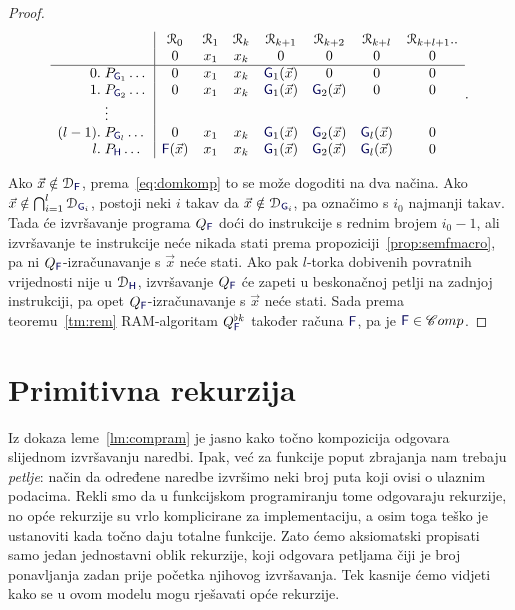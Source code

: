 \begin{proof}
\begin{equation}
\begin{array}{r@{\;}l|ccccccc}
      &               &\reg0       &\reg1&\reg{k}&\reg{k+1}     &\reg{k+2}     &\reg{k+l}     &\reg{k+l+1}..\\
      &               & 0          &x_1  &x_k    &0             &0             &0             &0            \\\hline
0.    &P_{\f G_1}\dots& 0          &x_1  &x_k    &\f G_1(\vec x)&0             &0             &0            \\
1.    &P_{\f G_2}\dots& 0          &x_1  &x_k    &\f G_1(\vec x)&\f G_2(\vec x)&0             &0            \\
      &\vdots                                                                                               \\
(l-1).&P_{\f G_l}\dots& 0          &x_1  &x_k    &\f G_1(\vec x)&\f G_2(\vec x)&\f G_l(\vec x)&0            \\
l.    &P_{\f H}\dots  &\f F(\vec x)&x_1  &x_k    &\f G_1(\vec x)&\f G_2(\vec x)&\f G_l(\vec x)&0
    \end{array}\text.
\end{equation}
\smallskip

Ako $\vec x\notin\dom{\f F}$, prema~\eqref{eq:domkomp} to se može dogoditi na dva načina. Ako $\vec x\notin\bigcap_{i=1}^l\dom{\f G_i}$, postoji neki $i$ takav da $\vec x\notin\dom{\f G_i}$, pa označimo s $i_0$ najmanji takav. Tada će izvršavanje programa $Q_{\f F}$ doći do instrukcije s rednim brojem $i_0-1$, ali izvršavanje te instrukcije neće nikada stati prema propoziciji~\ref{prop:semfmacro}, pa ni $Q_{\f F}$-izračunavanje s $\vec x$ neće stati. Ako pak $l$-torka dobivenih povratnih vrijednosti nije u $\dom{\f H}$, izvršavanje $Q_{\f F}$ će zapeti u beskonačnoj petlji na zadnjoj instrukciji, pa opet $Q_{\f F}$-izračunavanje s $\vec x$ neće stati.
Sada prema teoremu~\ref{tm:rem} RAM-algoritam $Q_{\f F}^{\flat k}$ također računa $\f F$, pa je $\f F\in\mathscr Comp$.
\end{proof}

\section{Primitivna rekurzija}

Iz dokaza leme~\ref{lm:compram} je jasno kako točno kompozicija odgovara slijednom iz\-vrša\-va\-nju naredbi. Ipak, već za funkcije poput zbrajanja nam trebaju \emph{petlje}: način da određene naredbe izvršimo neki broj puta koji ovisi o ulaznim podacima. Rekli smo da u funkcijskom programiranju tome odgovaraju rekurzije, no opće rekurzije su vrlo komplicirane za implementaciju, a osim toga teško je ustanoviti kada točno daju totalne funkcije. Zato ćemo aksiomatski propisati samo jedan jednostavni oblik rekurzije, koji odgovara petljama čiji je broj ponavljanja zadan prije početka njihovog izvršavanja. Tek kasnije ćemo vidjeti kako se u ovom modelu mogu rješavati opće rekurzije.%

